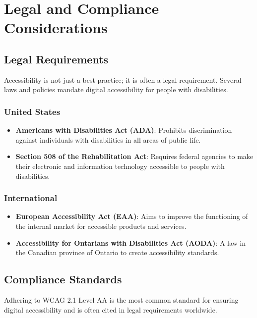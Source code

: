 \section{Legal and Compliance Considerations}\label{ch15:sec:legal-compliance}

\subsection{Legal Requirements}\label{ch15:ssec:legal-reqs}
Accessibility is not just a best practice; it is often a legal requirement. Several laws and policies mandate digital accessibility for people with disabilities.

\subsubsection{United States}\label{ch15:sssec:legal-us}
\begin{itemize}
	\item \textbf{Americans with Disabilities Act (ADA)}: Prohibits discrimination against individuals with disabilities in all areas of public life.
	\item \textbf{Section 508 of the Rehabilitation Act}: Requires federal agencies to make their electronic and information technology accessible to people with disabilities.
\end{itemize}

\subsubsection{International}\label{ch15:sssec:legal-intl}
\begin{itemize}
	\item \textbf{European Accessibility Act (EAA)}: Aims to improve the functioning of the internal market for accessible products and services.
	\item \textbf{Accessibility for Ontarians with Disabilities Act (AODA)}: A law in the Canadian province of Ontario to create accessibility standards.
\end{itemize}

\subsection{Compliance Standards}\label{ch15:ssec:compliance-standards}
Adhering to WCAG 2.1 Level AA is the most common standard for ensuring digital accessibility and is often cited in legal requirements worldwide.

